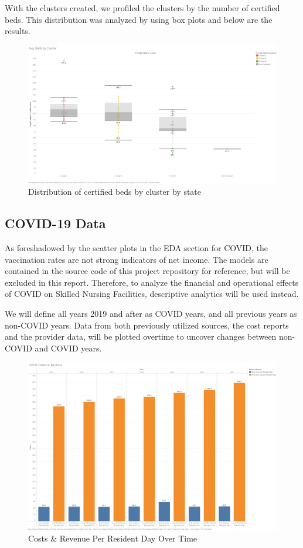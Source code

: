 \documentclass{article}
\theoremstyle{mytheoremstyle}
\theoremstyle{mytheoremstyle}
\theoremstyle{myproblemstyle}
\begin{document}
\pagebreak
With the clusters created, we profiled the clusters by the number of certified beds. This distribution was analyzed by using box plots and below are the results. 
\begin{figure}[htbp]
\centering
\includegraphics[width=\linewidth]{Images/Avg. Beds by Cluster.png}
\caption{Distribution of certified beds by cluster by state}
\label{bed dist.}
\end{figure}




\pagebreak

\subsection{COVID-19 Data}
As foreshadowed by the scatter plots in the EDA section for COVID, the vaccination rates are not strong indicators of net income. The models are contained in the source code of  this project repository for reference, but will be excluded in this report. Therefore, to analyze the financial and operational effects of COVID on Skilled Nursing Facilities, descriptive analytics will be used instead. 

We will define all years 2019 and after as COVID years, and all previous years as non-COVID years. Data from both previously utilized sources, the cost reports and the provider data, will be plotted overtime to uncover changes between non-COVID and COVID years.


\begin{figure}[htbp]
\centering
\includegraphics[width=\linewidth]{Images/COVID Costs vs. Revenue.png}
\caption{Costs \& Revenue Per Resident Day Over Time}
\label{fig:Robust Scaler Results}
\end{figure}
\end{document}
